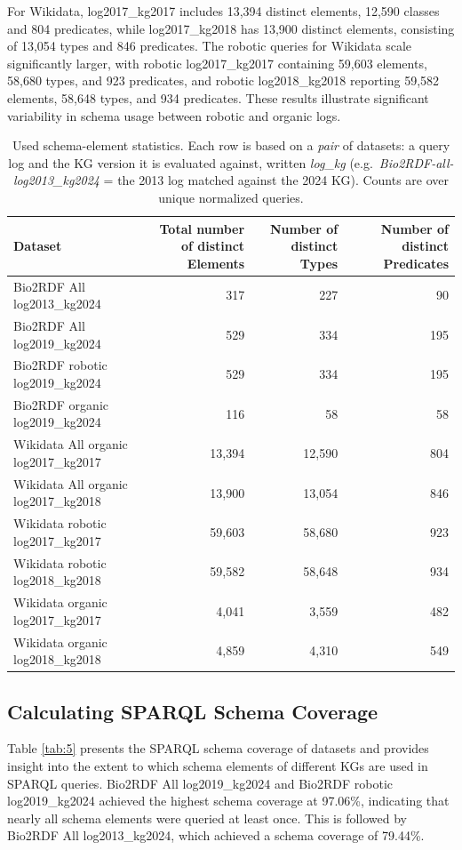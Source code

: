 \documentclass[sw]{iosart2x}
\begin{document}
For Wikidata, log2017\_kg2017 includes 13,394 distinct elements, 12,590 classes and 804 predicates, while log2017\_kg2018 has 13,900 distinct elements, consisting of 13,054 types and 846 predicates. The robotic queries for Wikidata scale significantly larger, with robotic log2017\_kg2017 containing 59,603 elements, 58,680 types, and 923 predicates, and robotic log2018\_kg2018 reporting 59,582 elements, 58,648 types, and 934 predicates. These results illustrate significant variability in schema usage between robotic and organic logs.
\begin{table}[ht]
\centering
\caption{Used schema-element statistics. Each row is based on a \emph{pair} of datasets: a query log and the KG version it is evaluated against, written \emph{log}\_\emph{kg} (e.g.\ \emph{Bio2RDF-all-log2013\_kg2024} = the 2013 log matched against the 2024 KG). Counts are over unique normalized queries.}
\label{tab:4}
\begin{tabular}{l|r|r|r}
\hline
Dataset & Total number of distinct Elements & Number of distinct Types & Number of distinct Predicates \\
\hline
Bio2RDF All log2013\_kg2024 & 317 & 227 & 90 \\
Bio2RDF All log2019\_kg2024 & 529 & 334 & 195 \\
Bio2RDF robotic log2019\_kg2024 &  529 & 334 & 195 \\
Bio2RDF organic log2019\_kg2024 &  116 & 58 & 58 \\
Wikidata All organic log2017\_kg2017 & 13,394 & 12,590 & 804 \\
Wikidata All organic log2017\_kg2018 & 13,900 & 13,054 & 846 \\
Wikidata robotic log2017\_kg2017 & 59,603 & 58,680 & 923 \\
Wikidata robotic log2018\_kg2018 & 59,582 & 58,648 & 934 \\
Wikidata organic log2017\_kg2017 & 4,041 & 3,559 & 482 \\
Wikidata organic log2018\_kg2018 & 4,859 & 4,310 & 549 \\
\hline
\end{tabular}
\end{table}

\subsection{Calculating SPARQL Schema Coverage}
Table \ref{tab:5} presents the SPARQL schema coverage of datasets and provides insight into the extent to which schema elements of different KGs are used in SPARQL queries. Bio2RDF All log2019\_kg2024 and Bio2RDF robotic log2019\_kg2024 achieved the highest schema coverage at 97.06\%, indicating that nearly all schema elements were queried at least once. This is followed by Bio2RDF All log2013\_kg2024, which achieved a schema coverage of 79.44\%.  
\end{document}
